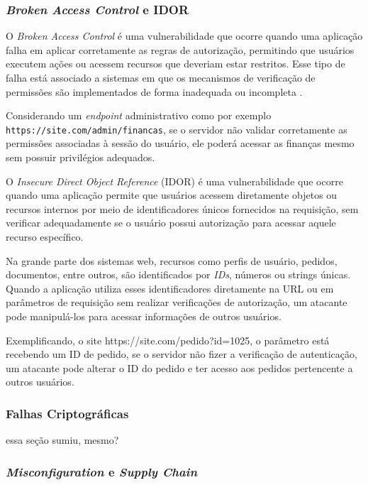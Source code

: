 \subsubsection{
    \textit{Broken Access Control} e IDOR
}

O \textit{Broken Access Control} é uma vulnerabilidade que ocorre quando uma aplicação falha em aplicar corretamente as regras de autorização, permitindo que usuários executem ações ou acessem recursos que deveriam estar restritos. Esse tipo de falha está associado a sistemas em que os mecanismos de verificação de permissões são implementados de forma inadequada ou incompleta \cite{kusnana:2025}.

Considerando um \textit{endpoint} administrativo como por exemplo \verb|https://site.com/admin/financas|, se o servidor não validar corretamente as permissões associadas à sessão do usuário, ele poderá acessar as finanças mesmo sem possuir privilégios adequados.

O \textit{Insecure Direct Object Reference} (IDOR) é uma vulnerabilidade que ocorre quando uma aplicação permite que usuários acessem diretamente objetos ou recursos internos por meio de identificadores únicos fornecidos na requisição, sem verificar adequadamente se o usuário possui autorização para acessar aquele recurso específico.

Na grande parte dos sistemas web, recursos como perfis de usuário, pedidos, documentos, entre outros, são identificados por \textit{IDs}, números ou strings únicas. Quando a aplicação utiliza esses identificadores diretamente na URL ou em parâmetros de requisição sem realizar verificações de autorização, um atacante pode manipulá-los para acessar informações de outros usuários.

Exemplificando, o site https://site.com/pedido?id=1025, o parâmetro está recebendo um ID de pedido, se o servidor não fizer a verificação de autenticação, um atacante pode alterar o ID do pedido e ter acesso aos pedidos pertencente a outros usuários.


{
\color{red}
\subsubsection{
    Falhas Criptográficas
}
essa seção sumiu, mesmo?
\lipsum[1-3]
}

\subsubsection{\textit{Misconfiguration} e \textit{Supply Chain}}


